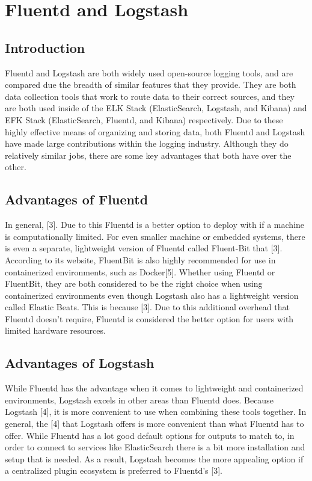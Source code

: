 \documentclass{article}
\begin{document}
\section{Fluentd and Logstash} \label{sec:comp}
\subsection{Introduction}
\quad \quad
Fluentd and Logstash are both widely used open-source logging tools, and are compared due the breadth of similar features that 
they provide. They are both data collection tools that work to route data to their correct sources, and they are both used inside of the 
ELK Stack (ElasticSearch, Logstash, and Kibana) and EFK Stack (ElasticSearch, Fluentd, and Kibana) respectively. Due to these highly effective means of organizing and storing data, both 
Fluentd and Logstash have made large contributions within the logging industry. Although they do relatively similar jobs, there are some key advantages that both have over the other.
\subsection{Advantages of Fluentd}
\quad \quad
In general, [3]. Due to this Fluentd is a better option to deploy with if a machine is
computationally limited. For even smaller machine or embedded systems, there is even a separate, lightweight version of Fluentd called Fluent-Bit that [3]. According to its website,
FluentBit is also highly recommended for use in containerized environments, such as Docker[5]. Whether using Fluentd or FluentBit, they are both considered to be the right choice when using containerized environments even 
though Logstash also has a lightweight version called Elastic Beats. This is because [3].
Due to this additional overhead that Fluentd doesn't require, Fluentd is considered the better option for users with limited hardware resources.
\subsection{Advantages of Logstash}
\quad \quad
While Fluentd has the advantage when it comes to lightweight and containerized environments, Logstash excels in other areas than Fluentd does. Because Logstash [4], it 
is more convenient to use when combining these tools together. In general, the [4] that Logstash offers is more convenient than what Fluentd has to offer. While Fluentd has a lot good
default options for outputs to match to, in order to connect to services like ElasticSearch there is a bit more installation and setup that is needed. As a result, Logstash becomes the more appealing option if a centralized plugin ecosystem is preferred to 
Fluentd's [3].
\end{document}
